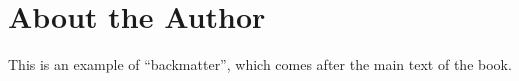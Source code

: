 \chapter*{About the Author}

This is an example of ``backmatter'', which comes after the main text of the book.
